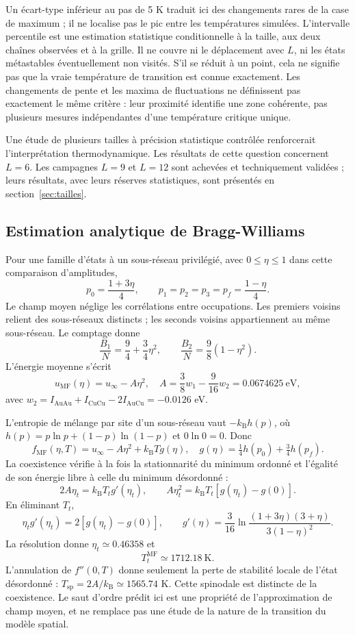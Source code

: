 \documentclass[10pt,a4paper]{article}
\newcommand{\Au}{\mathrm{Au}}
\newcommand{\Cu}{\mathrm{Cu}}
\newcommand{\kb}{k_{\mathrm B}}
\begin{document}
Un écart-type inférieur au pas de 5 K traduit ici des changements rares
de la case de maximum ; il ne localise pas le pic entre les températures
simulées. L'intervalle percentile est une estimation statistique conditionnelle à
la taille, aux deux chaînes observées et à la grille. Il ne couvre ni
le déplacement avec $L$, ni les états métastables éventuellement non
visités. S'il se réduit à un point, cela ne signifie pas que la vraie
température de transition est connue exactement. Les changements de pente
et les maxima de fluctuations ne définissent pas exactement le même
critère : leur proximité identifie une zone cohérente, pas plusieurs
mesures indépendantes d'une température critique unique.

Une étude de plusieurs tailles à précision statistique contrôlée
renforcerait l'interprétation thermodynamique. Les résultats de cette
question concernent $L=6$.
Les campagnes $L=9$ et $L=12$ sont achevées et techniquement validées ;
leurs résultats, avec leurs réserves statistiques, sont présentés en
section~\ref{sec:tailles}.

\subsection{Estimation analytique de Bragg-Williams}
Pour une famille d'états à un sous-réseau privilégié,
avec $0\leq\eta\leq1$ dans cette comparaison d'amplitudes,
\[
p_0=\frac{1+3\eta}{4},\qquad
p_1=p_2=p_3=p_f=\frac{1-\eta}{4}.
\]
Le champ moyen néglige les corrélations entre occupations. Les premiers
voisins relient des sous-réseaux distincts ; les seconds voisins appartiennent
au même sous-réseau. Le comptage donne
\[
\frac{B_1}{N}=\frac94+\frac34\eta^2,\qquad
\frac{B_2}{N}=\frac98(1-\eta^2).
\]
L'énergie moyenne s'écrit
\[
u_{\mathrm{MF}}(\eta)=u_\infty-A\eta^2,
\quad A=\frac38w_1-\frac9{16}w_2=0.0674625\ \mathrm{eV},
\]
avec $w_2=I_{\Au\Au}+I_{\Cu\Cu}-2I_{\Au\Cu}=-0.0126$ eV.

L'entropie de mélange par site d'un sous-réseau vaut $-\kb h(p)$, où
$h(p)=p\ln p+(1-p)\ln(1-p)$ et $0\ln0=0$. Donc
\[
f_{\mathrm{MF}}(\eta,T)=u_\infty-A\eta^2+\kb T g(\eta),
\quad g(\eta)=\tfrac14h(p_0)+\tfrac34h(p_f).
\]
La coexistence vérifie à la fois la stationnarité du minimum ordonné et
l'égalité de son énergie libre à celle du minimum désordonné :
\[
2A\eta_t=\kb T_tg'(\eta_t),\qquad
A\eta_t^2=\kb T_t[g(\eta_t)-g(0)].
\]
En éliminant $T_t$,
\[
\eta_tg'(\eta_t)=2[g(\eta_t)-g(0)],\qquad
g'(\eta)=\frac3{16}\ln\frac{(1+3\eta)(3+\eta)}{3(1-\eta)^2}.
\]
La résolution donne $\eta_t\simeq0.46358$ et
\[
\boxed{T_t^{\mathrm{MF}}\simeq1712.18\ \mathrm K.}
\]
L'annulation de $f''(0,T)$ donne seulement la perte de stabilité locale de
l'état désordonné : $T_{\mathrm{sp}}=2A/\kb\simeq1565.74$ K. Cette
spinodale est distincte de la coexistence. Le saut d'ordre prédit ici est
une propriété de l'approximation de champ moyen, et ne remplace pas une
étude de la nature de la transition du modèle spatial.
\end{document}
